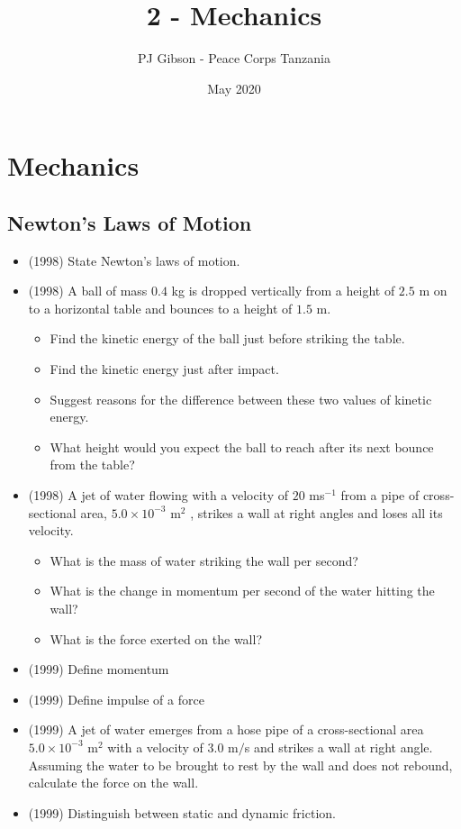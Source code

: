 \documentclass{article}
\title{\textbf{2 - Mechanics}}
\author{PJ Gibson - Peace Corps Tanzania}
\date{May 2020}
\newcommand{\mysection}[2]{\setcounter{section}{#1}\addtocounter{section}{-1}\section{#2}}
\begin{document}
\maketitle


\mysection{2}{Mechanics}

\subsection{Newton’s Laws of Motion}
\begin{itemize}
\item (1998)  State Newton's laws of motion.
\item (1998)  A ball of mass $ 0.4$ kg is dropped vertically from a height of $ 2.5$ m on to a horizontal table and bounces to a height of $ 1.5$ m.
 \begin{itemize}
\item Find the kinetic energy of the ball just before striking the table.
\item Find the kinetic energy just after impact.
\item Suggest reasons for the difference between these two values of kinetic energy.
\item What height would you expect the ball to reach after its next bounce from the table?
\end{itemize}
\item (1998)  A jet of water flowing with a velocity of $ 20$ ms$ ^{-1}$ from a pipe of cross-sectional area, $ 5.0 \times 10^{-3}$ m$ ^{2}$ , strikes a wall at right angles and loses all its velocity.
 \begin{itemize}
\item What is the mass of water striking the wall per second?
\item What is the change in momentum per second of the water hitting the wall?
\item What is the force exerted on the wall?
\end{itemize}
\item (1999)  Define momentum
\item (1999)  Define impulse of a force
\item (1999)  A jet of water emerges from a hose pipe of a cross-sectional area $ 5.0\times 10^{-3}$ m​$ ^{2}$ with a velocity of $ 3.0$ m$/$s and strikes a wall at right angle. Assuming the water to be brought to rest by the wall and does not rebound, calculate the force on the wall.
\item (1999)  Distinguish between static and dynamic friction.

\end{itemize}
\end{document}
